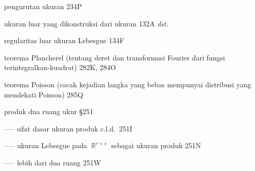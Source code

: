 













\indexmedskip















 pengurutan ukuran 234P




 ukuran luar yang dikonstruksi dari ukuran 132A {\it dst.}

regularitas luar ukuran Lebesgue 134F

\indexmedskip

















 teorema Plancherel (tentang deret dan transformasi Fourier dari fungsi terintegralkan-kuadrat) 282K, 284O














teorema Poisson (cacah kejadian langka yang bebas mempunyai distribusi yang mendekati Poisson) 285Q














 produk dua ruang ukur \S251

----- sifat dasar ukuran produk c.l.d.\ 251I

----- ukuran Lebesgue pada $\BbbR^{r+s}$ sebagai ukuran produk 251N


----- lebih dari dua ruang 251W

